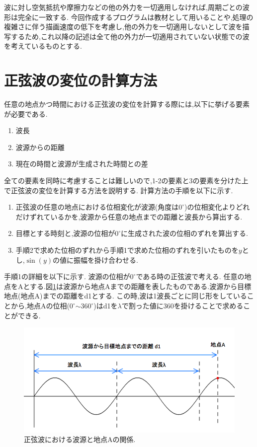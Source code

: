 波に対し空気抵抗や摩擦力などの他の外力を一切適用しなければ,周期ごとの波形は完全に一致する.
今回作成するプログラムは教材として用いることや,処理の複雑さに伴う描画速度の低下を考慮し,他の外力を一切適用しないとして波を描写するため,これ以降の記述は全て他の外力が一切適用されていない状態での波を考えているものとする.


\section{正弦波の変位の計算方法}
\label{sec:calculatey}
任意の地点かつ時間における正弦波の変位を計算する際には,以下に挙げる要素が必要である.
\begin{enumerate}
 \item 波長
 \item 波源からの距離
 \item 現在の時間と波源が生成された時間との差
 \end{enumerate}
全ての要素を同時に考慮することは難しいので,1-2の要素と3の要素を分けた上で正弦波の変位を計算する方法を説明する.
計算方法の手順を以下に示す.
\begin{enumerate}
\item 正弦波の任意の地点における位相変化が波源(角度は$0^{\circ}$)の位相変化よりどれだけずれているかを,波源から任意の地点までの距離と波長から算出する.
 \item 目標とする時刻と,波源の位相が$0^{\circ}$に生成された波の位相のずれを算出する.
\item 手順2で求めた位相のずれから手順1で求めた位相のずれを引いたものを$y$とし,$\sin(y)$の値に振幅を掛け合わせる.
 \end{enumerate}

手順1の詳細を以下に示す.
波源の位相が$0^{\circ}$である時の正弦波で考える.
任意の地点をAとする.図\ref{fig:dislam}は波源から地点Aまでの距離を表したものである.波源から目標地点(地点A)までの距離をd1とする.
この時,波は1波長ごとに同じ形をしていることから,地点Aの位相($0^{\circ}$$\sim$$360^{\circ}$)はd1を$\lambda$で割った値に360を掛けることで求めることができる.




\begin{figure}[htbp]
 \begin{center}
  \includegraphics[width=120mm]{../background/dislam1.png}
 \end{center}
 \caption{正弦波における波源と地点Aの関係.}
 \label{fig:dislam}
\end{figure}

